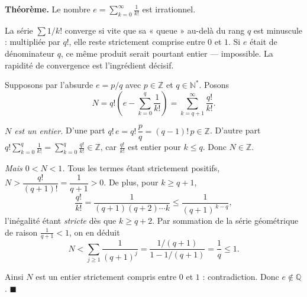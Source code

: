


\begin{tcolorbox}[thmbox]
  \textbf{Théorème.}\enspace%
  Le nombre $e = \displaystyle\sum_{k=0}^{\infty} \frac{1}{k!}$ est irrationnel.
\end{tcolorbox}

\begin{significationintuitive}
La série $\sum 1/k!$ converge si vite que sa « queue » au-delà du rang $q$ est
minuscule : multipliée par $q!$, elle reste strictement comprise entre $0$ et
$1$. Si $e$ était de dénominateur $q$, ce même produit serait pourtant entier —
impossible. La rapidité de convergence est l'ingrédient décisif.
\end{significationintuitive}


\begin{mdframed}[style=proofbar]
  Supposons par l'absurde $e = p/q$ avec $p \in \mathbb{Z}$ et $q \in \mathbb{N}^*$.
  Posons
  \[
    N = q!\left(e - \sum_{k=0}^{q} \frac{1}{k!}\right)
      = \sum_{k=q+1}^{\infty} \frac{q!}{k!} .
  \]

  \smallskip\noindent
  \textit{$N$ est un entier.}\enspace
  D'une part $q!\,e = q!\,\dfrac{p}{q} = (q-1)!\,p \in \mathbb{Z}$. D'autre part
  $q!\displaystyle\sum_{k=0}^{q}\frac1{k!} = \sum_{k=0}^{q}\frac{q!}{k!} \in \mathbb{Z}$,
  car $\frac{q!}{k!}$ est entier pour $k \leq q$. Donc $N \in \mathbb{Z}$.

  \smallskip\noindent
  \textit{Mais $0 < N < 1$.}\enspace
  Tous les termes étant strictement positifs, $N > \dfrac{q!}{(q+1)!} = \dfrac{1}{q+1} > 0$.
  De plus, pour $k \geq q+1$,
  \[
    \frac{q!}{k!} = \frac{1}{(q+1)(q+2)\cdots k} \leq \frac{1}{(q+1)^{\,k-q}},
  \]
  l'inégalité étant \emph{stricte} dès que $k \geq q+2$. Par sommation de la
  série géométrique de raison $\frac{1}{q+1} < 1$, on en déduit
  \[
    N < \sum_{j\geq 1} \frac{1}{(q+1)^{j}}
      = \frac{1/(q+1)}{1 - 1/(q+1)}
      = \frac{1}{q} \leq 1 .
  \]

  \smallskip\noindent
  Ainsi $N$ est un entier strictement compris entre $0$ et $1$ : contradiction.
  Donc $e \notin \mathbb{Q}$.
  $\blacksquare$
\end{mdframed}

